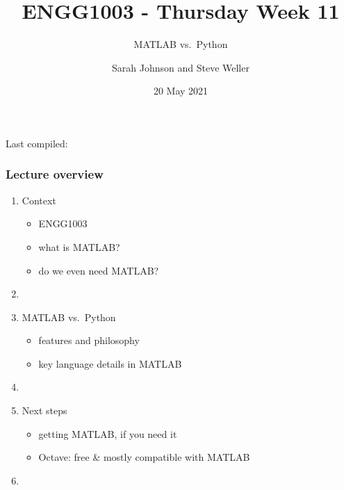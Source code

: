 \documentclass[english,14pt]{beamer}
\title{ENGG1003 - Thursday Week 11}
\subtitle{MATLAB vs.~Python}
\author{Sarah Johnson and Steve Weller}
\institute{University of Newcastle}
\date{20 May 2021}
\begin{document}
\begin{flushleft}
{\scriptsize Last compiled:~\DTMnow}
\vspace*{-5mm}
\end{flushleft}
\framebreak


\begin{frame}[fragile]

\frametitle{Lecture overview}
\begin{enumerate}
	\item Context
	\begin{itemize}
		\item ENGG1003
		\item what is MATLAB?
		\item do we even need MATLAB?
	\end{itemize}

	\item[]
	
	\item MATLAB vs.~Python
	\begin{itemize}
		\item features and philosophy
		\item key language details in MATLAB
	\end{itemize}
	

	\item[]

	\item Next steps
	\begin{itemize}
		\item getting MATLAB, if you need it
		\item Octave: free \& mostly compatible with MATLAB
	\end{itemize}

	\item[]

\end{enumerate}

\end{frame}

\end{document}
